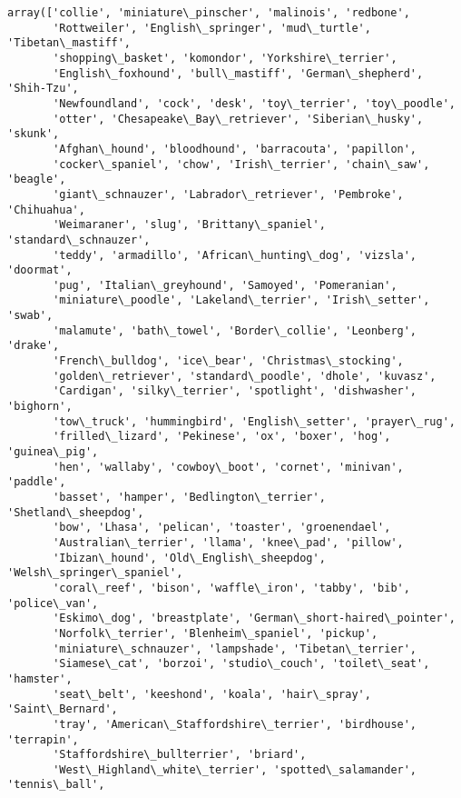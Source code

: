 \documentclass[11pt]{article}
\makeatletter
\newcommand{\boxspacing}{\kern\kvtcb@left@rule\kern\kvtcb@boxsep}
\newcommand{\prompt}[4]{
        {\ttfamily\llap{{\color{#2}[#3]:\hspace{3pt}#4}}\vspace{-\baselineskip}}
    }
\makeatother
\begin{document}
            \begin{tcolorbox}[breakable, size=fbox, boxrule=.5pt, pad at break*=1mm, opacityfill=0]
\prompt{Out}{outcolor}{26}{\boxspacing}
\begin{Verbatim}[commandchars=\\\{\}]
array(['collie', 'miniature\_pinscher', 'malinois', 'redbone',
       'Rottweiler', 'English\_springer', 'mud\_turtle', 'Tibetan\_mastiff',
       'shopping\_basket', 'komondor', 'Yorkshire\_terrier',
       'English\_foxhound', 'bull\_mastiff', 'German\_shepherd', 'Shih-Tzu',
       'Newfoundland', 'cock', 'desk', 'toy\_terrier', 'toy\_poodle',
       'otter', 'Chesapeake\_Bay\_retriever', 'Siberian\_husky', 'skunk',
       'Afghan\_hound', 'bloodhound', 'barracouta', 'papillon',
       'cocker\_spaniel', 'chow', 'Irish\_terrier', 'chain\_saw', 'beagle',
       'giant\_schnauzer', 'Labrador\_retriever', 'Pembroke', 'Chihuahua',
       'Weimaraner', 'slug', 'Brittany\_spaniel', 'standard\_schnauzer',
       'teddy', 'armadillo', 'African\_hunting\_dog', 'vizsla', 'doormat',
       'pug', 'Italian\_greyhound', 'Samoyed', 'Pomeranian',
       'miniature\_poodle', 'Lakeland\_terrier', 'Irish\_setter', 'swab',
       'malamute', 'bath\_towel', 'Border\_collie', 'Leonberg', 'drake',
       'French\_bulldog', 'ice\_bear', 'Christmas\_stocking',
       'golden\_retriever', 'standard\_poodle', 'dhole', 'kuvasz',
       'Cardigan', 'silky\_terrier', 'spotlight', 'dishwasher', 'bighorn',
       'tow\_truck', 'hummingbird', 'English\_setter', 'prayer\_rug',
       'frilled\_lizard', 'Pekinese', 'ox', 'boxer', 'hog', 'guinea\_pig',
       'hen', 'wallaby', 'cowboy\_boot', 'cornet', 'minivan', 'paddle',
       'basset', 'hamper', 'Bedlington\_terrier', 'Shetland\_sheepdog',
       'bow', 'Lhasa', 'pelican', 'toaster', 'groenendael',
       'Australian\_terrier', 'llama', 'knee\_pad', 'pillow',
       'Ibizan\_hound', 'Old\_English\_sheepdog', 'Welsh\_springer\_spaniel',
       'coral\_reef', 'bison', 'waffle\_iron', 'tabby', 'bib', 'police\_van',
       'Eskimo\_dog', 'breastplate', 'German\_short-haired\_pointer',
       'Norfolk\_terrier', 'Blenheim\_spaniel', 'pickup',
       'miniature\_schnauzer', 'lampshade', 'Tibetan\_terrier',
       'Siamese\_cat', 'borzoi', 'studio\_couch', 'toilet\_seat', 'hamster',
       'seat\_belt', 'keeshond', 'koala', 'hair\_spray', 'Saint\_Bernard',
       'tray', 'American\_Staffordshire\_terrier', 'birdhouse', 'terrapin',
       'Staffordshire\_bullterrier', 'briard',
       'West\_Highland\_white\_terrier', 'spotted\_salamander', 'tennis\_ball',

\end{Verbatim}
\end{tcolorbox}
\end{document}
